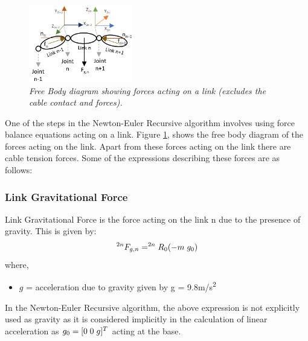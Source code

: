 \documentclass[a4paper,12pt]{report}
\begin{document}
\begin{figure}
	\centering
	\includegraphics[width=0.4\textwidth]{images/FBD.png}
	\caption{\textit{Free Body diagram showing forces acting on a link (excludes the cable contact and forces).}}
	\vspace{-50pt}
	\label{FBD}
\end{figure}
One of the steps in the Newton-Euler Recursive algorithm involves using force balance equations acting on a link. Figure \ref{FBD}, shows the free body diagram of the forces acting on the link. Apart from these forces acting on the link there are cable tension forces. Some of the expressions describing these forces are as follows:


\subsubsection{Link Gravitational Force}
Link Gravitational Force is the force acting on the link n due to the presence of gravity. This is given by:
\begin{equation}
^{2n}F_{g,n}=^{2n}R_{0}(-m\hspace{1mm}g_0)
\end{equation}
where,
\begin{itemize}
	\renewcommand\labelitemi{--}
	\item $g$ = acceleration due to gravity given by g = 9.8m/s\textsuperscript{2}
\end{itemize}
In the Newton-Euler Recursive algorithm, the above expression is not explicitly used as gravity as it is considered implicitly in the calculation of linear acceleration as $g_0=[0 \hspace{1mm}0\hspace{1mm}g]^{T}$ acting at the base.
\end{document}
